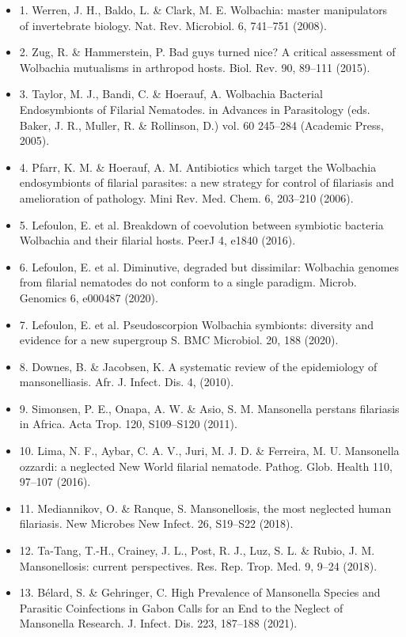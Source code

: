 \documentclass[10pt, a4paper, twocolumn]{article} %
\begin{document}
\begin{itemize}

\item 1.	Werren, J. H., Baldo, L. \& Clark, M. E. Wolbachia: master manipulators of invertebrate biology. Nat. Rev. Microbiol. 6, 741–751 (2008).
\item 2.	Zug, R. \& Hammerstein, P. Bad guys turned nice? A critical assessment of Wolbachia mutualisms in arthropod hosts. Biol. Rev. 90, 89–111 (2015).
\item 3.	Taylor, M. J., Bandi, C. \& Hoerauf, A. Wolbachia Bacterial Endosymbionts of Filarial Nematodes. in Advances in Parasitology (eds. Baker, J. R., Muller, R. \& Rollinson, D.) vol. 60 245–284 (Academic Press, 2005).
\item 4.	Pfarr, K. M. \& Hoerauf, A. M. Antibiotics which target the Wolbachia endosymbionts of filarial parasites: a new strategy for control of filariasis and amelioration of pathology. Mini Rev. Med. Chem. 6, 203–210 (2006).
\item 5.	Lefoulon, E. et al. Breakdown of coevolution between symbiotic bacteria Wolbachia and their filarial hosts. PeerJ 4, e1840 (2016).
\item 6.	Lefoulon, E. et al. Diminutive, degraded but dissimilar: Wolbachia genomes from filarial nematodes do not conform to a single paradigm. Microb. Genomics 6, e000487 (2020).
\item 7.	Lefoulon, E. et al. Pseudoscorpion Wolbachia symbionts: diversity and evidence for a new supergroup S. BMC Microbiol. 20, 188 (2020).
\item 8.	Downes, B. \& Jacobsen, K. A systematic review of the epidemiology of mansonelliasis. Afr. J. Infect. Dis. 4, (2010).
\item 9.	Simonsen, P. E., Onapa, A. W. \& Asio, S. M. Mansonella perstans filariasis in Africa. Acta Trop. 120, S109–S120 (2011).
\item 10.	Lima, N. F., Aybar, C. A. V., Juri, M. J. D. \& Ferreira, M. U. Mansonella ozzardi: a neglected New World filarial nematode. Pathog. Glob. Health 110, 97–107 (2016).
\item 11.	Mediannikov, O. \& Ranque, S. Mansonellosis, the most neglected human filariasis. New Microbes New Infect. 26, S19–S22 (2018).
\item 12.	Ta-Tang, T.-H., Crainey, J. L., Post, R. J., Luz, S. L. \& Rubio, J. M. Mansonellosis: current perspectives. Res. Rep. Trop. Med. 9, 9–24 (2018).
\item 13.	Bélard, S. \& Gehringer, C. High Prevalence of Mansonella Species and Parasitic Coinfections in Gabon Calls for an End to the Neglect of Mansonella Research. J. Infect. Dis. 223, 187–188 (2021).

\end{itemize}
\end{document}

